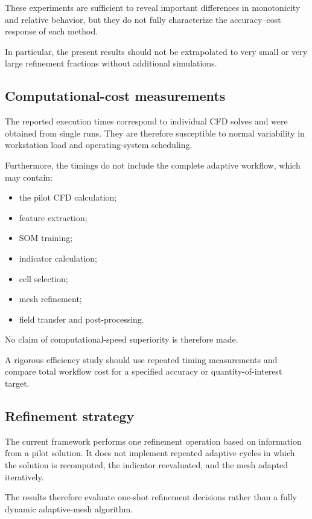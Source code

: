 These experiments are sufficient to reveal important differences in
monotonicity and relative behavior, but they do not fully characterize the
accuracy--cost response of each method.

In particular, the present results should not be extrapolated to very small
or very large refinement fractions without additional simulations.

\subsection{Computational-cost measurements}

The reported execution times correspond to individual CFD solves and were
obtained from single runs. They are therefore susceptible to normal
variability in workstation load and operating-system scheduling.

Furthermore, the timings do not include the complete adaptive workflow,
which may contain:

\begin{itemize}
    \item the pilot CFD calculation;
    \item feature extraction;
    \item SOM training;
    \item indicator calculation;
    \item cell selection;
    \item mesh refinement;
    \item field transfer and post-processing.
\end{itemize}

No claim of computational-speed superiority is therefore made.

A rigorous efficiency study should use repeated timing measurements and
compare total workflow cost for a specified accuracy or quantity-of-interest
target.

\subsection{Refinement strategy}

The current framework performs one refinement operation based on information
from a pilot solution. It does not implement repeated adaptive cycles in
which the solution is recomputed, the indicator reevaluated, and the mesh
adapted iteratively.

The results therefore evaluate one-shot refinement decisions rather than a
fully dynamic adaptive-mesh algorithm.

